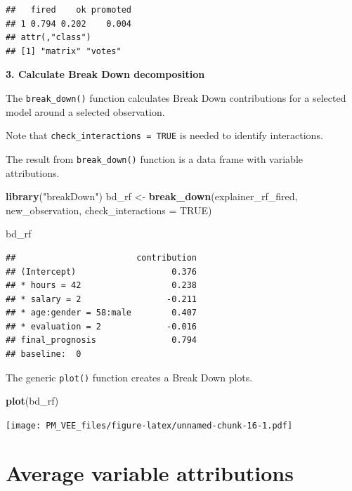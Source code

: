 \documentclass[]{krantz}
\newenvironment{Shaded}{\begin{snugshade}}{\end{snugshade}}
\newcommand{\DataTypeTok}[1]{\textcolor[rgb]{0.13,0.29,0.53}{#1}}
\newcommand{\KeywordTok}[1]{\textcolor[rgb]{0.13,0.29,0.53}{\textbf{#1}}}
\newcommand{\NormalTok}[1]{#1}
\newcommand{\OtherTok}[1]{\textcolor[rgb]{0.56,0.35,0.01}{#1}}
\newcommand{\StringTok}[1]{\textcolor[rgb]{0.31,0.60,0.02}{#1}}
\theoremstyle{definition}
\theoremstyle{definition}
\theoremstyle{definition}
\theoremstyle{remark}
\begin{document}
\begin{verbatim}
##   fired    ok promoted
## 1 0.794 0.202    0.004
## attr(,"class")
## [1] "matrix" "votes"
\end{verbatim}

\textbf{3. Calculate Break Down decomposition}

The \texttt{break\_down()} function calculates Break Down contributions
for a selected model around a selected observation.

Note that \texttt{check\_interactions\ =\ TRUE} is needed to identify
interactions.

The result from \texttt{break\_down()} function is a data frame with
variable attributions.

\begin{Shaded}
\begin{Highlighting}[]
\KeywordTok{library}\NormalTok{(}\StringTok{"breakDown"}\NormalTok{)}
\NormalTok{bd_rf <-}\StringTok{ }\KeywordTok{break_down}\NormalTok{(explainer_rf_fired,}
\NormalTok{                 new_observation,}
                 \DataTypeTok{check_interactions =} \OtherTok{TRUE}\NormalTok{)}

\NormalTok{bd_rf}
\end{Highlighting}
\end{Shaded}

\begin{verbatim}
##                        contribution
## (Intercept)                   0.376
## * hours = 42                  0.238
## * salary = 2                 -0.211
## * age:gender = 58:male        0.407
## * evaluation = 2             -0.016
## final_prognosis               0.794
## baseline:  0
\end{verbatim}

The generic \texttt{plot()} function creates a Break Down plots.

\begin{Shaded}
\begin{Highlighting}[]
\KeywordTok{plot}\NormalTok{(bd_rf) }
\end{Highlighting}
\end{Shaded}

\texttt{[image: PM\_VEE\_files/figure-latex/unnamed-chunk-16-1.pdf]}

\hypertarget{shapley}{%
\section{Average variable attributions}\label{shapley}}
\end{document}
